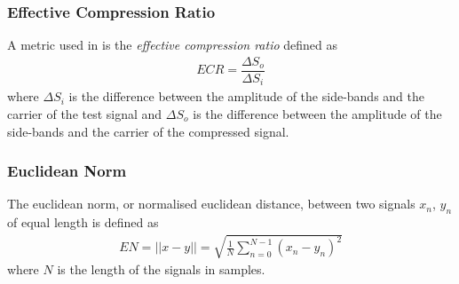 \documentclass[../main2.tex]{subfiles}
\begin{document}
\subsubsection{Effective Compression Ratio}
A metric used in \cite{reiss2012tutorial} is the \emph{effective compression ratio} defined as
\begin{align}
ECR = \dfrac{\Delta S_o}{\Delta S_i}
\end{align}
where $\Delta S_i$ is the difference between the amplitude of the side-bands and the carrier of the test signal and $\Delta S_o$ is the difference between the amplitude of the side-bands and the carrier of the compressed signal.

\subsubsection{Euclidean Norm}
The euclidean norm, or normalised euclidean distance, between two signals $x_n$, $y_n$ of equal length is defined as
\begin{align}
EN = ||x-y|| = \sqrt{\frac{1}{N}\sum_{n=0}^{N-1}(x_n-y_n)^2}
\end{align}
where $N$ is the length of the signals in samples.
\end{document}

